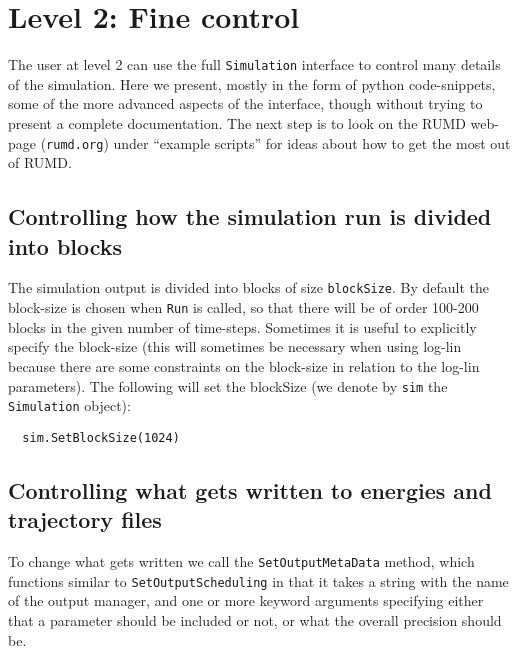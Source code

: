 
\section{Level 2: Fine control} 

%


The user at level 2 can use the full \verb|Simulation| interface
to control many details of the simulation. Here we 
present, mostly 
in the form of python code-snippets, some of the more advanced 
aspects of the interface, though
without trying to present a complete documentation. The next
step is to look on the RUMD web-page (\verb|rumd.org|) under ``example
scripts'' for ideas about how to get the most out of RUMD.


\subsection{Controlling how the simulation run is divided into blocks}

The simulation output is divided into blocks of size \verb|blockSize|. 
By default the block-size is chosen when \verb|Run| is called, so that
there will be of order 100-200 blocks in the given number of time-steps.
Sometimes it is useful to explicitly specify the block-size (this will sometimes be necessary when using log-lin because there are some constraints on the 
block-size in relation to the log-lin parameters). The following will set
the blockSize (we denote by \verb|sim| the \verb|Simulation| object):

\begin{verbatim}
  sim.SetBlockSize(1024)
\end{verbatim}

\subsection{Controlling what gets written to energies and trajectory files}

To change what gets written we call the \verb|SetOutputMetaData| method, which
functions similar to \verb|SetOutputScheduling| in that it takes a string with 
the name of the output manager, and one or more keyword arguments specifying 
either that a parameter should be included or not, or what the overall 
precision should be.


